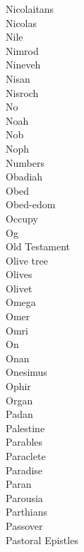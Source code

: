Nicolaitans  \\
Nicolas  \\
Nile  \\
Nimrod  \\
Nineveh  \\
Nisan  \\
Nisroch  \\
No  \\
Noah  \\
Nob  \\
Noph  \\
Numbers  \\
Obadiah  \\
Obed  \\
Obed-edom  \\
Occupy  \\
Og  \\
Old Testament  \\
Olive tree  \\
Olives  \\
Olivet  \\
Omega  \\
Omer  \\
Omri  \\
On  \\
Onan  \\
Onesimus  \\
Ophir  \\
Organ  \\
Padan  \\
Palestine  \\
Parables  \\
Paraclete  \\
Paradise  \\
Paran  \\
Parousia  \\
Parthians  \\
Passover  \\
Pastoral Epistles  \\
